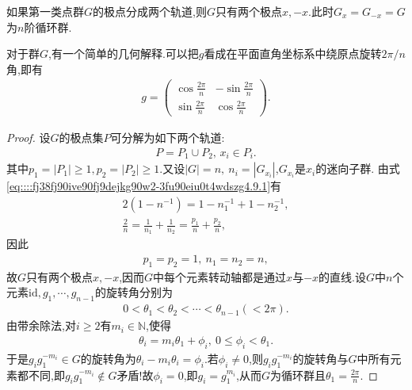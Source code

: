 \documentclass[../../main.tex]{subfiles}%
\begin{document}
\begin{theorem}
如果第一类点群$G$的极点分成两个轨道,则$G$只有两个极点$x,-x$.此时$G_x=G_{-x}=G$为$n$阶循环群.
\end{theorem}
\begin{remark}
对于群$G$,有一个简单的几何解释.可以把$g$看成在平面直角坐标系中绕原点旋转$2\pi/n$角,即有
\begin{align*}
g=\begin{pmatrix}
\cos\frac{2\pi}{n}&-\sin\frac{2\pi}{n}\\
\sin\frac{2\pi}{n}&\cos\frac{2\pi}{n}
\end{pmatrix}.
\end{align*}
\end{remark}
\begin{proof}

设$G$的极点集$P$可分解为如下两个轨道:
\begin{align*}
P=P_1\cup P_2,\,x_i\in P_i.
\end{align*}
其中$p_1=|P_1|\geqslant1,p_2=|P_2|\geqslant1$.又设$|G|=n,\ n_i=|G_{x_i}|$,$G_{x_i}$是$x_i$的迷向子群.
由式\eqref{eq::::fj38fj90ive90fj9dejkg90w2-3fu90eiu0t4wdszg4.9.1}有
\begin{align*}
2(1-n^{-1})=1-n_1^{-1}+1-n_2^{-1},\\
\frac{2}{n}=\frac{1}{n_1}+\frac{1}{n_2}=\frac{p_1}{n}+\frac{p_2}{n},
\end{align*}
因此
\begin{align*}
p_1=p_2=1,\ n_1=n_2=n,
\end{align*}
故$G$只有两个极点$x,-x$,因而$G$中每个元素转动轴都是通过$x$与$-x$的直线.设$G$中$n$个元素$\text{id},g_1,\cdots,g_{n-1}$的旋转角分别为
\begin{align*}
0<\theta_1<\theta_2<\cdots<\theta_{n-1}(<2\pi).
\end{align*}
由带余除法,对$i\geqslant 2$有$m_i\in\mathbb{N}$,使得
\begin{align*}
\theta_i=m_i\theta_1+\phi_i,\ 0\leqslant\phi_i<\theta_1.
\end{align*}
于是$g_ig_1^{-m_i}\in G$的旋转角为$\theta_i-m_i\theta_i=\phi_i$.若$\phi_i\neq 0$,则$g_ig_1^{-m_i}$的旋转角与$G$中所有元素都不同,即$g_ig_1^{-m_i}\notin G$矛盾!故$\phi_i=0$,即$g_i=g_1^{m_i}$,从而$G$为循环群且$\theta_1=\frac{2\pi}{n}$.

\end{proof}
\end{document}
